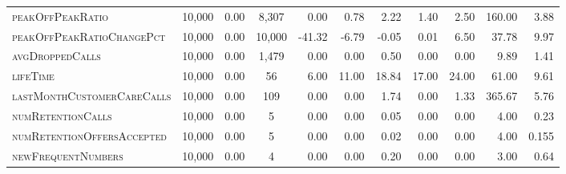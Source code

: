 \documentclass[xcolor={table}]{beamer}
\newcommand{\featN}[1]{\textsc{#1}}
\begin{document}
\begin{frame} [plain]
\begin{scriptsize}
{\begin{tabular}{  l  c  r  c r  r r r r r r}
\featN{peakOffPeakRatio}	&	10,000	&	0.00	&	8,307	&	0.00	&	0.78	&	2.22	&	1.40	&	2.50	&	160.00	&	3.88	\\
\featN{peakOffPeakRatioChangePct}	&	10,000	&	0.00	&	10,000	&	-41.32	&	-6.79	&	-0.05	&	0.01	&	6.50	&	37.78	&	9.97	\\
\featN{avgDroppedCalls}	&	10,000	&	0.00	&	1,479	&	0.00	&	0.00	&	0.50	&	0.00	&	0.00	&	9.89	&	1.41	\\
\featN{lifeTime}	&	10,000	&	0.00	&	56	&	6.00	&	11.00	&	18.84	&	17.00	&	24.00	&	61.00	&	9.61	\\
\featN{lastMonthCustomerCareCalls}	&	10,000	&	0.00	&	109	&	0.00	&	0.00	&	1.74	&	0.00	&	1.33	&	365.67	&	5.76	\\
\featN{numRetentionCalls}	&	10,000	&	0.00	&	5	&	0.00	&	0.00	&	0.05	&	0.00	&	0.00	&	4.00	&	0.23	\\
\featN{numRetentionOffersAccepted}	&	10,000	&	0.00	&	5	&	0.00	&	0.00	&	0.02	&	0.00	&	0.00	&	4.00	&	0.155	\\
\featN{newFrequentNumbers}	&	10,000	&	0.00	&	4	&	0.00	&	0.00	&	0.20	&	0.00	&	0.00	&	3.00	&	0.64	\\
\hline
\end{tabular}}
\end{scriptsize}
\end{frame} 
\end{document}
